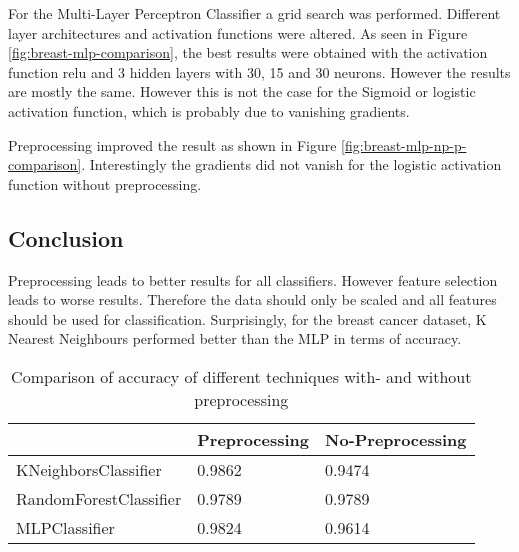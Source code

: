 For the Multi-Layer Perceptron Classifier a grid search was performed.
Different layer architectures and activation functions were altered.
As seen in Figure \ref{fig:breast-mlp-comparison}, the best results were obtained with the activation function relu and 3 hidden layers with 30, 15 and 30 neurons.
However the results are mostly the same. However  this is not the case for the Sigmoid or logistic activation function, which is probably due to vanishing gradients.


Preprocessing improved the result as shown in Figure \ref{fig:breast-mlp-np-p-comparison}.
Interestingly the gradients did not vanish for the logistic activation function without preprocessing.


\subsection{Conclusion}

Preprocessing leads to better results for all classifiers.
However feature selection leads to worse results.
Therefore the data should only be scaled and all features should be used for classification. Surprisingly, for the breast cancer dataset, K Nearest Neighbours performed better than the MLP in terms of accuracy.

\begin{table}[H]
\begin{center}
\begin{tabular}{|l|l|l|}
\hline
                       & Preprocessing & No-Preprocessing \\ \hline
KNeighborsClassifier   & 0.9862        & 0.9474           \\ \hline
RandomForestClassifier & 0.9789        & 0.9789           \\ \hline
MLPClassifier          & 0.9824        & 0.9614           \\ \hline
\end{tabular}
\caption{Comparison of accuracy of different techniques with- and without preprocessing}
\end{center}
\end{table}

